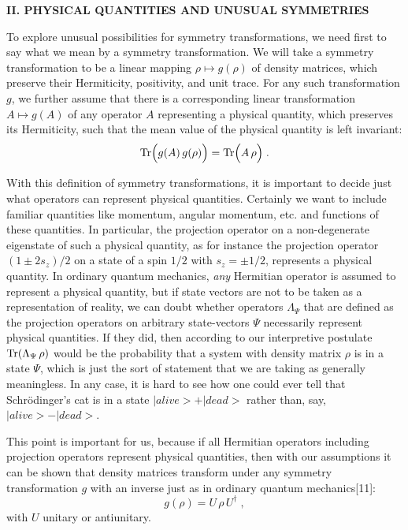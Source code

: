 \vspace{20pt}

\begin{center}
{\bf II. PHYSICAL QUANTITIES AND UNUSUAL SYMMETRIES}
\end{center}



To explore  unusual possibilities for symmetry transformations, we need first to say what we mean by a symmetry transformation.  
We will take a symmetry transformation to be a linear mapping $\rho\mapsto g(\rho)$ of density matrices,  which preserve their Hermiticity, positivity,  and unit trace.  For any such transformation $g$, we further assume that there is a corresponding linear transformation $A\mapsto g(A)$ of any operator $A$ representing a physical quantity, which preserves its Hermiticity,  such that the mean value of the physical quantity is left invariant:
\begin{equation}
{\rm Tr} \Big(g(A)\,g(\rho)\Big)={\rm Tr} \Big(A\,\rho\Big)\;.
\end{equation}

With this definition of symmetry transformations, it is important to decide just what operators can represent physical quantities.  Certainly we want to include familiar quantities like momentum, angular momentum, etc. and functions of these quantities.  In particular, the projection operator on a non-degenerate eigenstate of such a physical quantity, as for instance the projection operator $(1\pm2s_z)/2$ on a state of a spin $1/2$ with $s_z=\pm 1/2$, represents a physical quantity.   In ordinary quantum mechanics, {\em any} Hermitian operator is assumed to represent a physical quantity, but if state vectors are not to be taken as a representation of reality, we can doubt whether  operators $\Lambda_\Psi$  that are defined  as the projection operators on arbitrary state-vectors $\Psi$  necessarily represent   physical quantities.  If they did, then according to our interpretive postulate ${\rm Tr}(\Lambda_\Psi\,\rho)$ would be the probability that a system with density matrix $\rho$ is in a state $\Psi$, which is just the sort of statement that we are taking as generally meaningless.  In any case, it is hard to see how one could ever tell that Schr\"{o}dinger's cat is in a state $|alive>+|dead>$ rather than, say, $|alive>-|dead>$.  

This point is important for us,  because  if all Hermitian operators including projection operators represent physical quantities, then with our assumptions it can be shown that density matrices transform under any symmetry transformation $g$ with an inverse just as in ordinary quantum mechanics[11]:
\begin{equation}
 g(\rho)=U\,\rho\,U^\dagger\;,
\end{equation}
with $U$ unitary or antiunitary.

